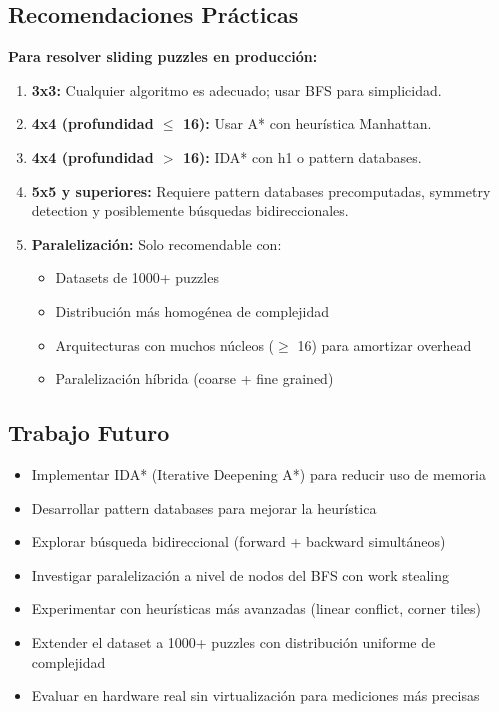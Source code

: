 \documentclass[12pt,a4paper]{article}
\begin{document}
\subsection{Recomendaciones Prácticas}

\textbf{Para resolver sliding puzzles en producción:}

\begin{enumerate}
    \item \textbf{3x3:} Cualquier algoritmo es adecuado; usar BFS para simplicidad.
    
    \item \textbf{4x4 (profundidad $\leq$ 16):} Usar A* con heurística Manhattan.
    
    \item \textbf{4x4 (profundidad $>$ 16):} IDA* con h1 o pattern databases.
    
    \item \textbf{5x5 y superiores:} Requiere pattern databases precomputadas, symmetry detection y posiblemente búsquedas bidireccionales.
    
    \item \textbf{Paralelización:} Solo recomendable con:
    \begin{itemize}
        \item Datasets de 1000+ puzzles
        \item Distribución más homogénea de complejidad
        \item Arquitecturas con muchos núcleos ($\geq$ 16) para amortizar overhead
        \item Paralelización híbrida (coarse + fine grained)
    \end{itemize}
\end{enumerate}

\subsection{Trabajo Futuro}

\begin{itemize}
    \item Implementar IDA* (Iterative Deepening A*) para reducir uso de memoria
    \item Desarrollar pattern databases para mejorar la heurística
    \item Explorar búsqueda bidireccional (forward + backward simultáneos)
    \item Investigar paralelización a nivel de nodos del BFS con work stealing
    \item Experimentar con heurísticas más avanzadas (linear conflict, corner tiles)
    \item Extender el dataset a 1000+ puzzles con distribución uniforme de complejidad
    \item Evaluar en hardware real sin virtualización para mediciones más precisas
\end{itemize}
\end{document}
